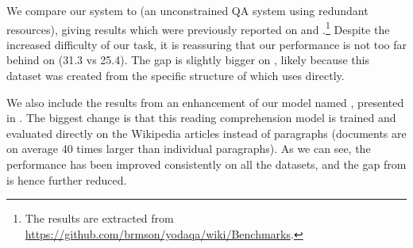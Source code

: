 We compare our system to  \cite{baudivs2015yodaqa} (an unconstrained QA system using redundant resources), giving results which were previously reported on  and .\footnote{The results are extracted from \href{https://github.com/brmson/yodaqa/wiki/Benchmarks}{https://github.com/brmson/yodaqa/wiki/Benchmarks}.} Despite the increased difficulty of our task, it is reassuring that our performance is not too far behind on  (31.3 vs 25.4). The gap is slightly bigger on , likely because this dataset was created from the specific structure of  which  uses directly.

We also include the results from an enhancement of our model named , presented in . The biggest change is that this reading comprehension model is trained and evaluated directly on the Wikipedia articles instead of paragraphs (documents are on average 40 times larger than individual paragraphs). As we can see, the performance has been improved consistently on all the datasets, and the gap from  is hence further reduced.


